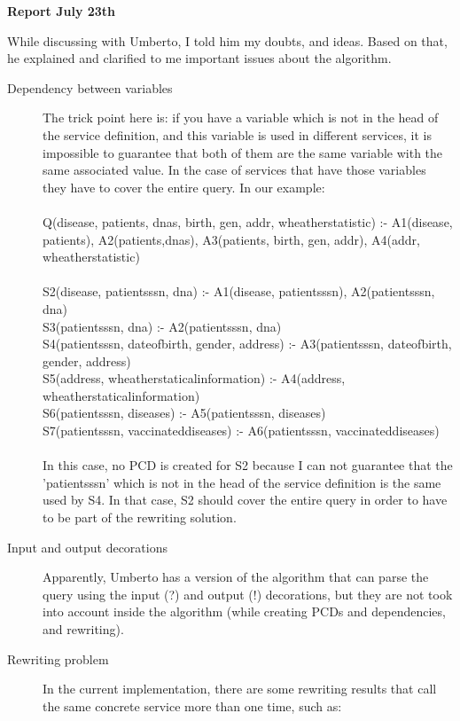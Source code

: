 \documentclass[12pt,a4paper,oneside]{report}
\begin{document}
\begin{center}
\textbf{\large{Report July 23th}} \\
\end{center}

While discussing with Umberto, I told him my doubts, and ideas. Based on that, he explained and clarified to me important issues about the algorithm.
\begin{description}
\item[Dependency between variables] The trick point here is: if you have a variable which is not in the head of the service definition, and this variable is used in different services, it is impossible to guarantee that both of them are the same variable with the same associated value. In the case of services that have those variables they have to cover the entire query. In our example: \\
\\
Q(disease, patients, dnas, birth, gen, addr, wheatherstatistic) :- A1(disease, patients), A2(patients,dnas), A3(patients, birth, gen, addr), A4(addr, wheatherstatistic) \\
\\
S2(disease, patientsssn, dna) :- A1(disease, patientsssn), A2(patientsssn, dna)\\
S3(patientsssn, dna) :- A2(patientsssn, dna)\\
S4(patientsssn, dateofbirth, gender, address) :- A3(patientsssn, dateofbirth, gender, address)\\
S5(address, wheatherstaticalinformation) :- A4(address, wheatherstaticalinformation)\\
S6(patientsssn, diseases) :- A5(patientsssn, diseases)\\
S7(patientsssn, vaccinateddiseases) :- A6(patientsssn, vaccinateddiseases)\\
\\
In this case, no PCD is created for S2 because I can not guarantee that the 'patientsssn' which is not in the head of the service definition is the same used by S4. In that case, S2 should cover the entire query in order to have to be part of the rewriting solution.
\item[Input and output decorations] Apparently, Umberto has a version of the algorithm that can parse the query using the input (?) and output (!) decorations, but they are not took into account inside the algorithm (while creating PCDs and dependencies, and rewriting).
\item[Rewriting problem] In the current implementation, there are some rewriting results that call the same concrete service more than one time, such as: \\

\end{description}
\end{document}
